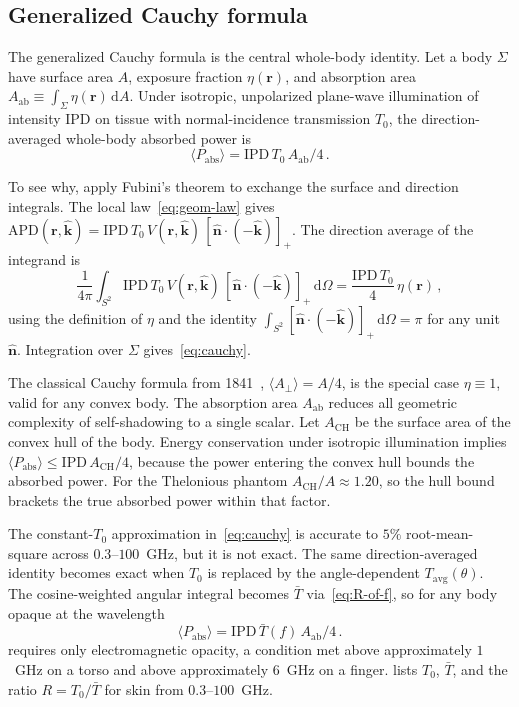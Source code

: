 \documentclass[journal,twocolumn,10pt]{IEEEtran}
\newcommand{\khat}{\hat{\bm{k}}}
\newcommand{\nhat}{\hat{\bm{n}}}
\newcommand{\rr}{\mathbf{r}}
\newcommand{\IPD}{\mathrm{IPD}}
\newcommand{\APD}{\mathrm{APD}}
\newcommand{\Aab}{A_{\mathrm{ab}}}
\newcommand{\Aperp}{A_\perp}
\newcommand{\Tavg}{T_{\mathrm{avg}}}
\newcommand{\Tbar}{\bar{T}}
\newcommand{\diff}{\mathrm{d}}
\newcommand{\pospart}[1]{\left[#1\right]_{+}}
\newcommand{\Vis}{V}
\begin{document}
\subsection{Generalized Cauchy formula}\label{subsec:cauchy-thm}

The generalized Cauchy formula is the central whole-body identity.
Let a body $\Sigma$ have surface area $A$, exposure fraction
$\eta(\rr)$, and absorption area
$\Aab \equiv \int_\Sigma \eta(\rr)\,\diff A$. Under isotropic,
unpolarized plane-wave illumination of intensity $\IPD$ on tissue
with normal-incidence transmission $T_0$, the direction-averaged
whole-body absorbed power is
\begin{equation}\label{eq:cauchy}
  \langle P_{\mathrm{abs}} \rangle = \IPD\,T_0\,\Aab/4\, .
\end{equation}

To see why, apply Fubini's theorem to exchange the surface and direction
integrals. The local law~\eqref{eq:geom-law} gives
$\APD(\rr,\khat) = \IPD\,T_0\,\Vis(\rr,\khat)\,
\pospart{\nhat\cdot(-\khat)}$. The direction average of the integrand
is
\[
  \frac{1}{4\pi}\int_{S^2}
  \IPD\,T_0\,\Vis(\rr,\khat)\,\pospart{\nhat\cdot(-\khat)}\,
  \diff\Omega
  = \frac{\IPD\,T_0}{4}\,\eta(\rr)\,,
\]
using the definition of $\eta$ and the identity $\int_{S^2}
\pospart{\nhat\cdot(-\khat)}\,\diff\Omega = \pi$ for any unit
$\nhat$. Integration over $\Sigma$ gives~\eqref{eq:cauchy}.

The classical Cauchy formula from 1841~\cite{Cauchy1841},
$\langle\Aperp\rangle = A/4$, is the special case $\eta \equiv 1$,
valid for any convex body. The
absorption area $\Aab$ reduces all geometric complexity of
self-shadowing to a single scalar. Let $A_{\mathrm{CH}}$ be the
surface area of the convex hull of the body. Energy conservation under
isotropic illumination implies
$\langle P_{\mathrm{abs}} \rangle \le \IPD\,A_{\mathrm{CH}}/4$, because
the power entering the convex hull bounds the absorbed power. For the
Thelonious phantom $A_{\mathrm{CH}}/A \approx 1.20$, so the hull bound
brackets the true absorbed power within that factor.

The constant-$T_0$ approximation in~\eqref{eq:cauchy} is accurate to
$5\%$ root-mean-square across $0.3$--$100$~GHz, but it is not
exact. The same direction-averaged identity becomes exact when $T_0$
is replaced by the angle-dependent $\Tavg(\theta)$. The
cosine-weighted angular integral becomes $\Tbar$
via~\eqref{eq:R-of-f}, so for any body opaque at the wavelength
\begin{equation}\label{eq:cauchy-exact}
  \langle P_{\mathrm{abs}} \rangle = \IPD\,\Tbar(f)\,\Aab/4 \,.
\end{equation}
 requires only electromagnetic opacity, a
condition met above approximately $1$~GHz on a torso and above
approximately $6$~GHz on a finger.  lists $T_0$,
$\Tbar$, and the ratio $R = T_0/\Tbar$ for skin from $0.3$--$100$~GHz.
\end{document}
